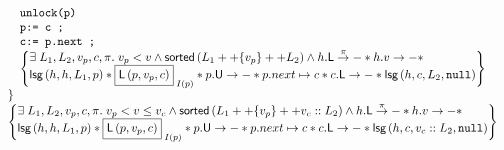\[\begin{array}{l}
\begin{array}{l}
\begin{array}{l}
			 	\command{unlock(p)}\\
			 	\command{p:= c ;}\\
			 	\command{c:= p.next ;}\\

				\left\{
			 	\begin{array}{@{} l @{}}
				 	\exsts{L_1, L_2, v_p, c, \pi} v_p < v \land  \sorted{L_1 ++ \{v_p\} ++ L_2}  \land \lockT{h}[\pi] * \valueT{h}{v} * \\
					\lsg{h}{h}{L_1}{p} 
				 	* \shared{\lockedNode{p}{v_p}{c}}{I(p)} 
				 	* \unlockT{p} * \cell{p.next}{c} * \lockT{c}
				 	* \lsg{h}{c}{L_2}{\nil}
			 	
			 	\end{array}
			 	\right\}
		
			\end{array}
		
	\end{array}\\
	\}\\
	\left\{
 	\begin{array}{@{} l @{}}
	 	\exsts{L_1, L_2, v_p, c, \pi} v_p < v \leq v_c \land \sorted{L_1 ++ \{v_p\} ++  v_c::L_2}  \land \lockT{h}[\pi] * \valueT{h}{v} * \\
		\lsg{h}{h}{L_1}{p} 
	 	* \shared{\lockedNode{p}{v_p}{c}}{I(p)} 
	 	* \unlockT{p} * \cell{p.next}{c} * \lockT{c}
	 	* \lsg{h}{c}{v_c ::L_2}{\nil}
 	
 	\end{array}
 	\right\}

\end{array}
\]
%
%
